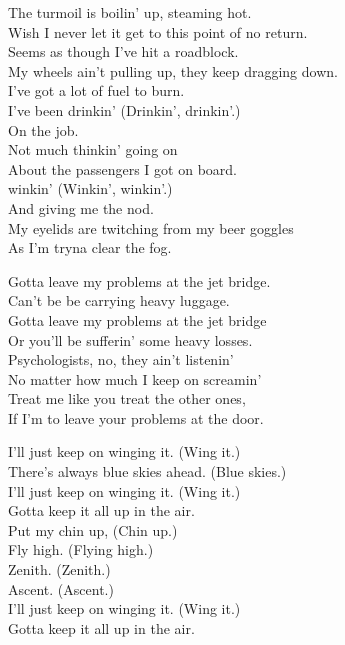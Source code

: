 
The turmoil is boilin' up, steaming hot. \\
Wish I never let it get to this point of no return. \\
Seems as though I've hit a roadblock. \\
My wheels ain't pulling up, they keep dragging down. \\

I've got a lot of fuel to burn. \\
I've been drinkin' (Drinkin', drinkin'.) \\
On the job. \\
Not much thinkin' going on \\
About the passengers I got on board. \\

 winkin' (Winkin', winkin'.) \\
And giving me the nod. \\
My eyelids are twitching from my beer goggles \\
As I'm tryna clear the fog. \\


Gotta leave my problems at the jet bridge. \\
Can't be be carrying heavy luggage. \\
Gotta leave my problems at the jet bridge \\
Or you'll be sufferin' some heavy losses. \\

Psychologists, no, they ain't listenin' \\
No matter how much I keep on screamin' \\
Treat me like you treat the other ones, \\
If I'm to leave your problems at the door. \\


I'll just keep on winging it. (Wing it.) \\
There's always blue skies ahead. (Blue skies.) \\
I'll just keep on winging it. (Wing it.) \\
Gotta keep it all up in the air. \\

Put my chin up, (Chin up.) \\
Fly high. (Flying high.) \\
Zenith. (Zenith.) \\
Ascent. (Ascent.) \\
I'll just keep on winging it. (Wing it.) \\
Gotta keep it all up in the air. \\

